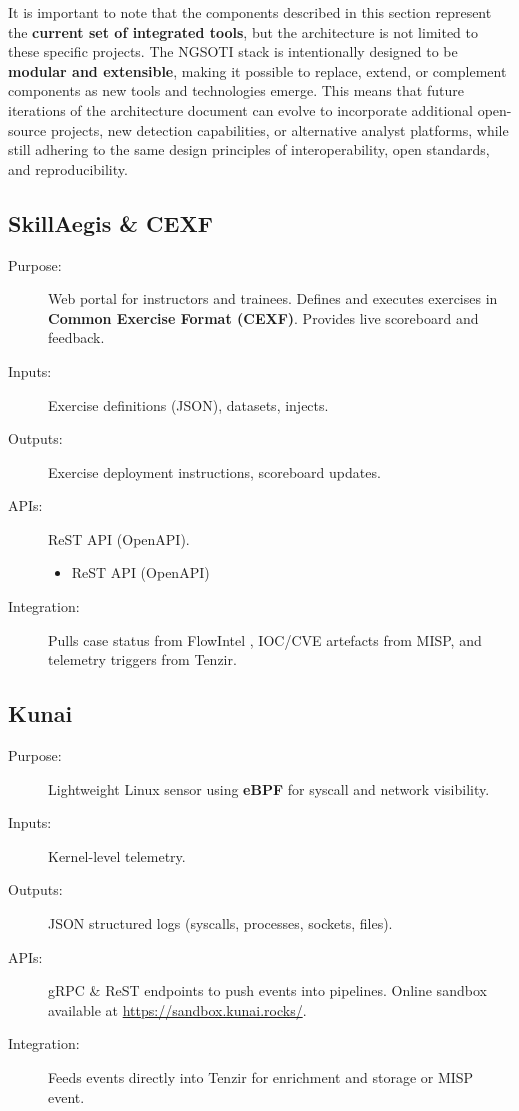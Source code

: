 \documentclass[10pt,a4paper]{report}
\begin{document}
It is important to note that the components described in this section
represent the \textbf{current set of integrated tools}, but the architecture is
not limited to these specific projects. The NGSOTI stack is intentionally
designed to be \textbf{modular and extensible}, making it possible to replace,
extend, or complement components as new tools and technologies emerge. This
means that future iterations of the architecture document can evolve to
incorporate additional open-source projects, new detection capabilities, or
alternative analyst platforms, while still adhering to the same design
principles of interoperability, open standards, and reproducibility.

\subsection{SkillAegis \& CEXF}
\begin{description}
  \item[Purpose:] Web portal for instructors and trainees. Defines and executes
        exercises in \textbf{Common Exercise Format (CEXF)\cite{cexf}}. Provides live
        scoreboard and feedback.
  \item[Inputs:] Exercise definitions (JSON), datasets, injects.
  \item[Outputs:] Exercise deployment instructions, scoreboard updates.
  \item[APIs:] ReST API (OpenAPI).
    \begin{itemize}
        \item ReST API (OpenAPI)
    \end{itemize}
  \item[Integration:] Pulls case status from FlowIntel \cite{flowintel}, IOC/CVE
artefacts from MISP, and telemetry triggers from Tenzir.
\end{description}


\subsection{Kunai}

\begin{description}
  \item[Purpose:] Lightweight Linux sensor using \textbf{eBPF} for syscall and
       network visibility.
  \item[Inputs:] Kernel-level telemetry.
  \item[Outputs:] JSON structured logs (syscalls, processes, sockets, files).
  \item[APIs:] gRPC \& ReST endpoints to push events into pipelines. Online
       sandbox\cite{sandbox} available at \url{https://sandbox.kunai.rocks/}.
  \item[Integration:] Feeds events directly into Tenzir for enrichment and
       storage or MISP event.
\end{description}
\end{document}
